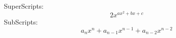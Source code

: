 \documentclass[12pt]{article}
\begin{document}
SuperScripts:
$$2x^{ax^2+bx+c}$$
SubScripts:
$$a_nx^n+a_{n-1}x^{n-1}+a_{n-2}x^{n-2}$$
\end{document}
